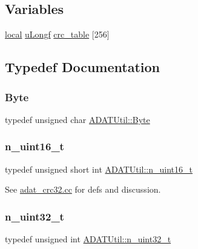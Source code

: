 \subsection*{Variables}
\begin{DoxyCompactItemize}
\item 
\mbox{\hyperlink{adat__crc32_8cc_a08023ea6765c99d60a6a3840cd07156e}{local}} \mbox{\hyperlink{namespaceADATUtil_adf7f8db2cc2f19fe6143cf8a2ad881f4}{u\+Longf}} \mbox{\hyperlink{namespaceADATUtil_abfc0fdaa6ec59bc44e1eb27433d2d024}{crc\+\_\+table}} \mbox{[}256\mbox{]}
\end{DoxyCompactItemize}


\subsection{Typedef Documentation}
\mbox{\label{namespaceADATUtil_a420451c5593252de7271d104b24079b5}} 
\subsubsection{\texorpdfstring{Byte}{Byte}}
{\footnotesize\ttfamily typedef unsigned char \mbox{\hyperlink{namespaceADATUtil_a420451c5593252de7271d104b24079b5}{A\+D\+A\+T\+Util\+::\+Byte}}}

\mbox{\label{namespaceADATUtil_a8e184fda37156fed1e06319a0051e987}} 
\subsubsection{\texorpdfstring{n\_uint16\_t}{n\_uint16\_t}}
{\footnotesize\ttfamily typedef unsigned short int \mbox{\hyperlink{namespaceADATUtil_a8e184fda37156fed1e06319a0051e987}{A\+D\+A\+T\+Util\+::n\+\_\+uint16\+\_\+t}}}



See \mbox{\hyperlink{adat__crc32_8cc}{adat\+\_\+crc32.\+cc}} for defs and discussion. 

\mbox{\label{namespaceADATUtil_ad945a8afa4db2d1f89b731964adae97e}} 
\subsubsection{\texorpdfstring{n\_uint32\_t}{n\_uint32\_t}}
{\footnotesize\ttfamily typedef unsigned int \mbox{\hyperlink{namespaceADATUtil_ad945a8afa4db2d1f89b731964adae97e}{A\+D\+A\+T\+Util\+::n\+\_\+uint32\+\_\+t}}}


